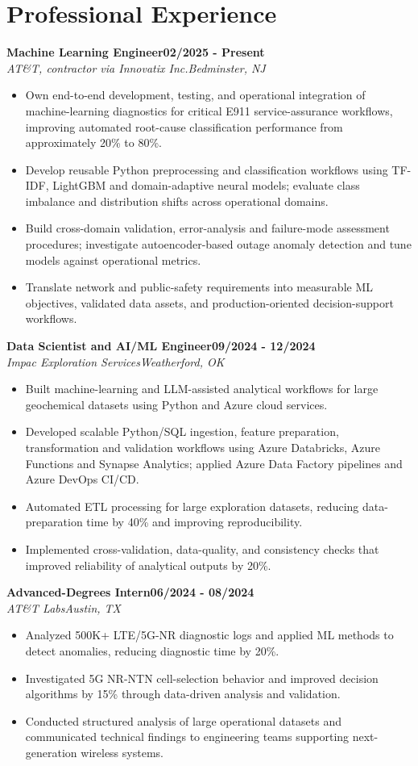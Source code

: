 \documentclass[9pt,letterpaper]{extarticle}
\newcommand{\role}[4]{%
  \Needspace{4\baselineskip}\textbf{#1}\hfill\textbf{#2}\\[-1pt]
  \textit{#3}\hfill\textit{#4}\par}
\begin{document}
\section{Professional Experience}
\role{Machine Learning Engineer}{02/2025 - Present}{AT\&T, contractor via Innovatix Inc.}{Bedminster, NJ}
\begin{itemize}
\item Own end-to-end development, testing, and operational integration of machine-learning diagnostics for critical E911 service-assurance workflows, improving automated root-cause classification performance from approximately 20\% to 80\%.
\item Develop reusable Python preprocessing and classification workflows using TF-IDF, LightGBM and domain-adaptive neural models; evaluate class imbalance and distribution shifts across operational domains.
\item Build cross-domain validation, error-analysis and failure-mode assessment procedures; investigate autoencoder-based outage anomaly detection and tune models against operational metrics.
\item Translate network and public-safety requirements into measurable ML objectives, validated data assets, and production-oriented decision-support workflows.
\end{itemize}
\role{Data Scientist and AI/ML Engineer}{09/2024 - 12/2024}{Impac Exploration Services}{Weatherford, OK}
\begin{itemize}
\item Built machine-learning and LLM-assisted analytical workflows for large geochemical datasets using Python and Azure cloud services.
\item Developed scalable Python/SQL ingestion, feature preparation, transformation and validation workflows using Azure Databricks, Azure Functions and Synapse Analytics; applied Azure Data Factory pipelines and Azure DevOps CI/CD.
\item Automated ETL processing for large exploration datasets, reducing data-preparation time by 40\% and improving reproducibility.
\item Implemented cross-validation, data-quality, and consistency checks that improved reliability of analytical outputs by 20\%.
\end{itemize}
\role{Advanced-Degrees Intern}{06/2024 - 08/2024}{AT\&T Labs}{Austin, TX}
\begin{itemize}
\item Analyzed 500K+ LTE/5G-NR diagnostic logs and applied ML methods to detect anomalies, reducing diagnostic time by 20\%.
\item Investigated 5G NR-NTN cell-selection behavior and improved decision algorithms by 15\% through data-driven analysis and validation.
\item Conducted structured analysis of large operational datasets and communicated technical findings to engineering teams supporting next-generation wireless systems.
\end{itemize}
\end{document}

